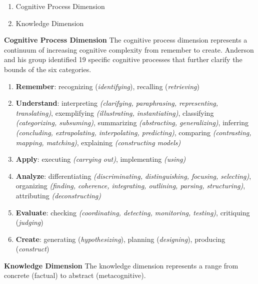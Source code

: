 \documentclass[]{article}
\begin{document}
\begin{enumerate}
  \item Cognitive Process Dimension
  \item Knowledge Dimension
\end{enumerate}

\textbf{Cognitive Process Dimension}
The cognitive process dimension represents a continuum of increasing cognitive complexity from remember to create. Anderson and his group identified 19 specific cognitive processes that further clarify the bounds of the six categories.

\begin{enumerate}
  \item \textbf{Remember}: recognizing (\textit{identifying}), recalling (\textit{retrieving})
  \item \textbf{Understand}:  interpreting \textit{(clarifying, paraphrasing, representing, translating)},
  exemplifying \textit{(illustrating, instantiating)}, 
  classifying \textit{(categorizing, subsuming)},  
  summarizing \textit{(abstracting, generalizing)},  
  inferring \textit{(concluding, extrapolating, interpolating, predicting)},  
  comparing \textit{(contrasting, mapping, matching)},  
  explaining \textit{(constructing models)}
  
  \item \textbf{Apply}: executing \textit{(carrying out)}, implementing \textit{(using)}
  
  \item \textbf{Analyze}:  differentiating \textit{(discriminating, distinguishing, focusing, selecting)},  organizing \textit{(finding, coherence, integrating, outlining, parsing, structuring)}, 
  attributing \textit{(deconstructing)}
  
  \item \textbf{Evaluate}:  checking \textit{(coordinating, detecting, monitoring, testing)},  
  critiquing (\textit{judging})
  
  \item \textbf{Create}: generating (\textit{hypothesizing}), planning (\textit{designing}), producing (\textit{construct})
  
  
\end{enumerate}

\textbf{Knowledge Dimension}
The knowledge dimension represents a range from concrete (factual) to abstract (metacognitive). 
\end{document}
